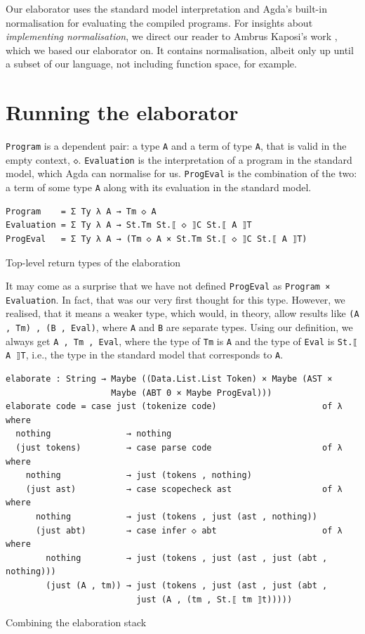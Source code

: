 Our elaborator uses the standard model interpretation and Agda's built-in normalisation for evaluating the compiled programs. For insights about \textit{implementing normalisation}, we direct our reader to Ambrus Kaposi's work \cite{typesystems-repo}, which we based our elaborator on. It contains normalisation, albeit only up until a subset of our language, not including function space, for example.

\section{Running the elaborator} \label{sec:running}

\verb$Program$ is a dependent pair: a type \verb$A$ and a term of type \verb$A$, that is valid in the empty context, \verb$◇$. \verb$Evaluation$ is the interpretation of a program in the standard model, which Agda can normalise for us. \verb$ProgEval$ is the combination of the two: a term of some type \verb$A$ along with its evaluation in the standard model.

\begin{listing}[H]
\begin{verbatim}
Program    = Σ Ty λ A → Tm ◇ A
Evaluation = Σ Ty λ A → St.Tm St.⟦ ◇ ⟧C St.⟦ A ⟧T
ProgEval   = Σ Ty λ A → (Tm ◇ A × St.Tm St.⟦ ◇ ⟧C St.⟦ A ⟧T)
\end{verbatim}
\caption{Top-level return types of the elaboration}
\label{code:elab-types}
\end{listing}

It may come as a surprise that we have not defined \verb$ProgEval$ as \verb$Program × Evaluation$. In fact, that was our very first thought for this type. However, we realised, that it means a weaker type, which would, in theory, allow results like \verb$(A , Tm) , (B , Eval)$, where \verb$A$ and \verb$B$ are separate types. Using our definition, we always get \verb$A , Tm , Eval$, where the type of \verb$Tm$ is \verb$A$ and the type of \verb$Eval$ is \verb$St.⟦ A ⟧T$, i.e., the type in the standard model that corresponds to \verb$A$.

\begin{listing}[H]
\begin{verbatim}
elaborate : String → Maybe ((Data.List.List Token) × Maybe (AST ×
                     Maybe (ABT 0 × Maybe ProgEval)))
elaborate code = case just (tokenize code)                     of λ where
  nothing               → nothing
  (just tokens)         → case parse code                      of λ where
    nothing             → just (tokens , nothing)
    (just ast)          → case scopecheck ast                  of λ where
      nothing           → just (tokens , just (ast , nothing))
      (just abt)        → case infer ◇ abt                     of λ where
        nothing         → just (tokens , just (ast , just (abt , nothing)))
        (just (A , tm)) → just (tokens , just (ast , just (abt ,
                          just (A , (tm , St.⟦ tm ⟧t)))))
\end{verbatim}
\caption{Combining the elaboration stack}
\label{code:elab-elaborate}
\end{listing}


